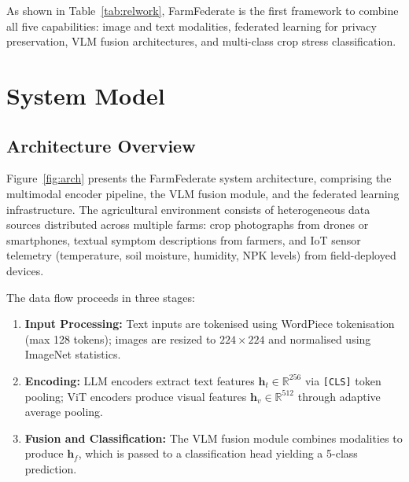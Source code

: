 \documentclass[conference]{IEEEtran}
\begin{document}
As shown in Table~\ref{tab:relwork}, FarmFederate is the first framework to combine all
five capabilities: image and text modalities, federated learning for privacy preservation,
VLM fusion architectures, and multi-class crop stress classification.

\section{System Model}
\label{sec:sysmodel}

\subsection{Architecture Overview}

Figure~\ref{fig:arch} presents the FarmFederate system architecture, comprising the
multimodal encoder pipeline, the VLM fusion module, and the federated learning
infrastructure. The agricultural environment consists of heterogeneous data sources
distributed across multiple farms: crop photographs from drones or smartphones, textual
symptom descriptions from farmers, and IoT sensor telemetry (temperature, soil moisture,
humidity, NPK levels) from field-deployed devices.

The data flow proceeds in three stages:
\begin{enumerate}
  \item \textbf{Input Processing:} Text inputs are tokenised using WordPiece tokenisation
        (max 128 tokens); images are resized to $224{\times}224$ and normalised using
        ImageNet statistics.
  \item \textbf{Encoding:} LLM encoders extract text features $\mathbf{h}_t \in
        \mathbb{R}^{256}$ via \texttt{[CLS]} token pooling; ViT encoders produce visual
        features $\mathbf{h}_v \in \mathbb{R}^{512}$ through adaptive average pooling.
  \item \textbf{Fusion and Classification:} The VLM fusion module combines modalities
        to produce $\mathbf{h}_f$, which is passed to a classification head yielding a
        5-class prediction.
\end{enumerate}
\end{document}
